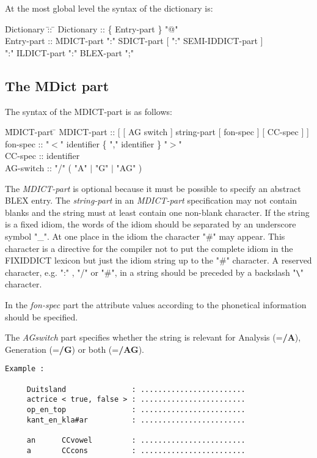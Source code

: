 At the most global level the syntax of the dictionary is: 

\begin {tabbing}
   \= Dictionary \= :: \= \kill
   \> Dictionary \> :: \{ Entry-part \} "@" \\
   \> Entry-part \> :: MDICT-part ":" SDICT-part [ ":" SEMI-IDDICT-part ]\\
   \>            \>     ":" ILDICT-part ":" BLEX-part ";" 

\end {tabbing}

\subsection {The MDict part}

The syntax of the MDICT-part is as follows:

\begin {tabbing}
   \= MDICT-part \= \kill
   \> MDICT-part \> :: [ [ AG switch ] string-part [ fon-spec ] [ CC-spec ] ] \\
   \> fon-spec   \> :: "$<$" identifier \{ "," identifier \} "$>$" \\
   \> CC-spec    \> :: identifier \\
   \> AG-switch  \> :: "/" ( "A" $\mid$ "G" $\mid$ "AG" )

\end {tabbing}

The {\em MDICT-part} is optional because it must be possible to specify 
an abstract BLEX entry.
The {\em string-part} in an {\em MDICT-part} specification may not contain 
blanks and the string must at least contain one non-blank character. If the 
string is a fixed idiom, the words of the idiom should be separated by an 
underscore symbol "\_". At one place in the idiom the character "\#" may appear. 
This character is a directive for the compiler not to put the complete idiom in 
the FIXIDDICT lexicon but just the idiom string up to the "\#" character. 
A reserved character, e.g.
":" , "/" or "\#", in a string should be preceded by a backslash "\verb+\+" 
character.

In the
{\em fon-spec} part the attribute values according to the phonetical 
information should be specified. 

The {\em AGswitch} part specifies whether the string is relevant for
Analysis (={\bf /A}), Generation (={\bf /G}) or both (={\bf /AG}).

\begin{verbatim}
Example :

     Duitsland               : ........................
     actrice < true, false > : ........................
     op_en_top               : ........................
     kant_en_kla#ar          : ........................

     an      CCvowel         : ........................
     a       CCcons          : ........................
     
\end{verbatim}

